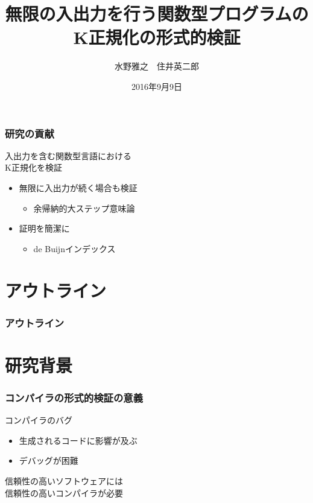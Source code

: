 \documentclass[dvipdfmx,cjk,xcolor=dvipsnames,envcountsect,notheorems,12pt]{beamer}
\title{無限の入出力を行う関数型プログラムのK正規化の形式的検証}
\author{水野雅之　住井英二郎}
\institute[東北大学　住井・松田研]{東北大学 大学院情報科学研究科}%
\date{2016年9月9日}
\theoremstyle{definition}
\begin{document}
\frame[plain]{\titlepage}%

\begin{frame}
	\frametitle{研究の貢献}
	\LARGE 入出力を含む関数型言語における\\
	K正規化を検証
	\begin{itemize}
		\item 無限に入出力が続く場合も検証
			\begin{itemize}
				\item 余帰納的大ステップ意味論
			\end{itemize}
		\item 証明を簡潔に
			\begin{itemize}
				\item de Buijnインデックス
			\end{itemize}
	\end{itemize}
\end{frame}

\section*{アウトライン}

\begin{frame}
  \frametitle{アウトライン}
  \tableofcontents[sectionstyle=show,subsectionstyle=hide]
\end{frame}

\section{研究背景}

\begin{frame}
	\frametitle{コンパイラの形式的検証の意義}
	\LARGE コンパイラのバグ
	\begin{itemize}
		\item 生成されるコードに影響が及ぶ
		\item デバッグが困難
	\end{itemize}

	\vfill

	信頼性の高いソフトウェアには\\信頼性の高いコンパイラが必要
\end{frame}
\end{document}
